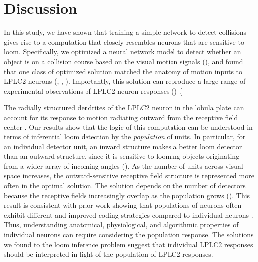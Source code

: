 \documentclass[pdftex,9pt,lineno]{elife}
\begin{document}
\label{video:hit_multi_outward}

\label{video:hit_multi_inward}


\section{Discussion}

In this study, we have shown that training a simple network to detect collisions gives rise to a computation that closely resembles neurons that are sensitive to loom. Specifically, we optimized a neural network model to detect whether an object is on a collision course based on the visual motion signals (), and found that one class of optimized solution matched the anatomy of motion inputs to LPLC2 neurons (, , ). Importantly, this solution can reproduce a large range of experimental observations of LPLC2 neuron responses () \citep{klapoetke2017ultra,von2017feature,ache2019neural}.]

The radially structured dendrites of the LPLC2 neuron in the lobula plate can account for its response to motion radiating outward from the receptive field center \citep{klapoetke2017ultra}. Our results show that the logic of this computation can be understood in terms of inferential loom detection by the \textit{population} of units. In particular, for an individual detector unit, an inward structure makes a better loom detector than an outward structure, since it is sensitive to looming objects originating from a wider array of incoming angles (). As the number of units across visual space increases, the outward-sensitive receptive field structure is represented more often in the optimal solution. The solution depends on the number of detectors because the receptive fields increasingly overlap as the population grows (). This result is consistent with prior work showing that populations of neurons often exhibit different and improved coding strategies compared to individual neurons \citep{pasupathy2002population,georgopoulos1986neuronal,vogels1990population,franke2016structures,zylberberg2016direction,cafaro2020global}. Thus, understanding anatomical, physiological, and algorithmic properties of individual neurons can require considering the population response. The solutions we found to the loom inference problem suggest that individual LPLC2 responses should be interpreted in light of the population of LPLC2 responses.
\end{document}
